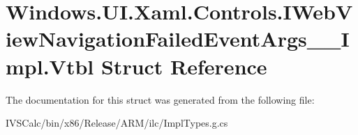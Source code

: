 \hypertarget{struct_windows_1_1_u_i_1_1_xaml_1_1_controls_1_1_i_web_view_navigation_failed_event_args_____impl_1_1_vtbl}{}\section{Windows.\+U\+I.\+Xaml.\+Controls.\+I\+Web\+View\+Navigation\+Failed\+Event\+Args\+\_\+\+\_\+\+Impl.\+Vtbl Struct Reference}
\label{struct_windows_1_1_u_i_1_1_xaml_1_1_controls_1_1_i_web_view_navigation_failed_event_args_____impl_1_1_vtbl}


The documentation for this struct was generated from the following file\+:\begin{DoxyCompactItemize}
\item 
I\+V\+S\+Calc/bin/x86/\+Release/\+A\+R\+M/ilc/Impl\+Types.\+g.\+cs\end{DoxyCompactItemize}
